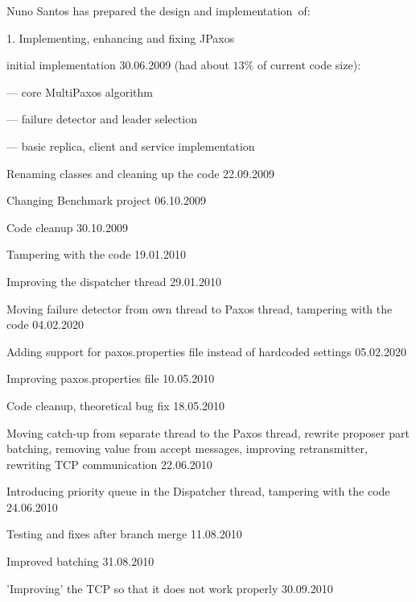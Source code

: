 \noindent Nuno Santos has prepared the design and implementation~of:
\begin{tightList}
 \item[1.] Implementing, enhancing and fixing JPaxos
  \begin{tightList}
    \item[\textbullet] initial implementation 30.06.2009 (had about $13\%$ of current code size):
    \begin{tightList}
      \item[---] core MultiPaxos algorithm
      \item[---] failure detector and leader selection
      \item[---] basic replica, client and service implementation
    \end{tightList}
    \item[\textbullet] Renaming classes and cleaning up the code 22.09.2009
    \item[\textbullet] Changing Benchmark project 06.10.2009
    \item[\textbullet] Code cleanup 30.10.2009
    \item[\textbullet] Tampering with the code 19.01.2010
    \item[\textbullet] Improving the dispatcher thread 29.01.2010
    \item[\textbullet] Moving failure detector from own thread to Paxos thread, tampering with the code 04.02.2020
    \item[\textbullet] Adding support for paxos.properties file instead of hardcoded settings 05.02.2020
    \item[\textbullet] Improving paxos.properties file 10.05.2010
    \item[\textbullet] Code cleanup, theoretical bug fix 18.05.2010
    \item[\textbullet] Moving catch-up from separate thread to the Paxos thread, rewrite proposer part batching, removing value from accept messages, improving retransmitter, rewriting TCP communication 22.06.2010
    \item[\textbullet] Introducing priority queue in the Dispatcher thread, tampering with the code 24.06.2010
    \item[\textbullet] Testing and fixes after branch merge 11.08.2010
    \item[\textbullet] Improved batching 31.08.2010
    \item[\textbullet] 'Improving' the TCP so that it does not work properly 30.09.2010
  \end{tightList}


\end{tightList}
